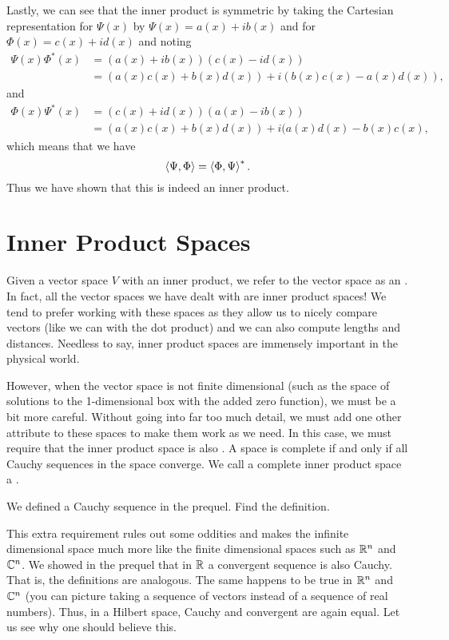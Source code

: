 Lastly, we can see that the inner product is symmetric by taking the Cartesian representation for $\Psi(x)$ by $\Psi(x)=a(x)+ib(x)$ and for $\Phi(x)=c(x)+id(x)$ and noting
\begin{align*}
	\Psi(x)\Phi^*(x) &= (a(x)+ib(x))(c(x)-id(x))\\
		&= (a(x)c(x)+b(x)d(x))+i(b(x)c(x)-a(x)d(x)),
\end{align*}
and
\begin{align*}
	\Phi(x)\Psi^*(x) &= (c(x)+id(x))(a(x)-ib(x))\\
		&= (a(x)c(x)+b(x)d(x))+i(a(x)d(x)-b(x)c(x),
\end{align*}
which means that we have
\[
\left\langle \Psi, \Phi \right\rangle=\left\langle \Phi, \Psi \right\rangle^*.
\]
Thus we have shown that this is indeed an inner product.

\section{Inner Product Spaces}

Given a vector space $V$ with an inner product, we refer to the vector space as an .  In fact, all the vector spaces we have dealt with are inner product spaces! We tend to prefer working with these spaces as they allow us to nicely compare vectors (like we can with the dot product) and we can also compute lengths and distances.  Needless to say, inner product spaces are immensely important in the physical world.

However, when the vector space is not finite dimensional (such as the space of solutions to the 1-dimensional box with the added zero function), we must be a bit more careful.  Without going into far too much detail, we must add one other attribute to these spaces to make them work as we need.  In this case, we must require that the inner product space is also .  A space is complete if and only if all Cauchy sequences in the space converge. We call a complete inner product space a .

\begin{exercise}
	We defined a Cauchy sequence in the prequel. Find the definition.
\end{exercise}

This extra requirement rules out some oddities and makes the infinite dimensional space much more like the finite dimensional spaces such as $\mathbb{R}^n$ and $\mathbb{C}^n$.  We showed in the prequel that in $\mathbb{R}$ a convergent sequence is also Cauchy. That is, the definitions are analogous. The same happens to be true in $\mathbb{R}^n$ and $\mathbb{C}^n$ (you can picture taking a sequence of vectors instead of a sequence of real numbers).  Thus, in a Hilbert space, Cauchy and convergent are again equal. Let us see why one should believe this.

